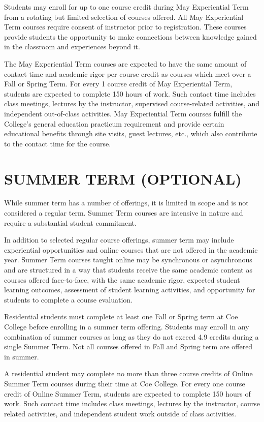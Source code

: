 \documentclass[
  letterpaper,
]{scrbook}
\begin{document}
Students may enroll for up to one course credit during May Experiential
Term from a rotating but limited selection of courses offered. All May
Experiential Term courses require consent of instructor prior to
registration. These courses provide students the opportunity to make
connections between knowledge gained in the classroom and experiences
beyond it.

The May Experiential Term courses are expected to have the same amount
of contact time and academic rigor per course credit as courses which
meet over a Fall or Spring Term. For every 1 course credit of May
Experiential Term, students are expected to complete 150 hours of work.
Such contact time includes class meetings, lectures by the instructor,
supervised course-related activities, and independent out-of-class
activities. May Experiential Term courses fulfill the College's general
education practicum requirement and provide certain educational benefits
through site visits, guest lectures, etc., which also contribute to the
contact time for the course.

\section{SUMMER TERM (OPTIONAL)}\label{summer-term-optional}

While summer term has a number of offerings, it is limited in scope and
is not considered a regular term. Summer Term courses are intensive in
nature and require a substantial student commitment.

In addition to selected regular course offerings, summer term may
include experiential opportunities and online courses that are not
offered in the academic year. Summer Term courses taught online may be
synchronous or asynchronous and are structured in a way that students
receive the same academic content as courses offered face-to-face, with
the same academic rigor, expected student learning outcomes, assessment
of student learning activities, and opportunity for students to complete
a course evaluation.

Residential students must complete at least one Fall or Spring term at
Coe College before enrolling in a summer term offering. Students may
enroll in any combination of summer courses as long as they do not
exceed 4.9 credits during a single Summer Term. Not all courses offered
in Fall and Spring term are offered in summer.

A residential student may complete no more than three course credits of
Online Summer Term courses during their time at Coe College. For every
one course credit of Online Summer Term, students are expected to
complete 150 hours of work. Such contact time includes class meetings,
lectures by the instructor, course related activities, and independent
student work outside of class activities.
\end{document}
